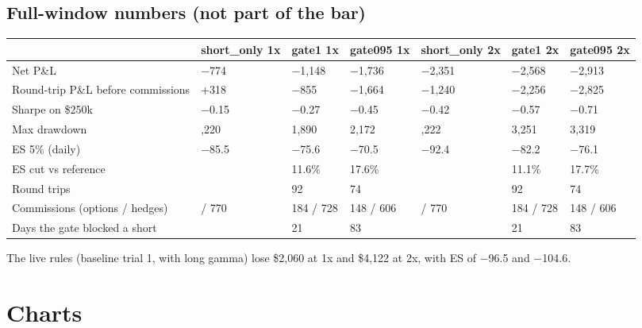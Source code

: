 \documentclass{article}
\begin{document}
\subsection{Full-window numbers (not part of the bar)}

\begin{center}\small
\begin{tabularx}{\linewidth}{>{\raggedright\arraybackslash}X >{\raggedright\arraybackslash}X l l >{\raggedright\arraybackslash}X l l}
\toprule
\textbf{} & \textbf{short\_only 1x} & \textbf{gate1 1x} & \textbf{gate095 1x} & \textbf{short\_only 2x} & \textbf{gate1 2x} & \textbf{gate095 2x} \\
\midrule
Net P\&L & \ensuremath{-}774 & \ensuremath{-}1,148 & \ensuremath{-}1,736 & \ensuremath{-}2,351 & \ensuremath{-}2,568 & \ensuremath{-}2,913 \\
Round-trip P\&L before commissions & +318 & \ensuremath{-}855 & \ensuremath{-}1,664 & \ensuremath{-}1,240 & \ensuremath{-}2,256 & \ensuremath{-}2,825 \\
Sharpe on \$250k & \ensuremath{-}0.15 & \ensuremath{-}0.27 & \ensuremath{-}0.45 & \ensuremath{-}0.42 & \ensuremath{-}0.57 & \ensuremath{-}0.71 \\
Max drawdown & 2,220 & 1,890 & 2,172 & 3,222 & 3,251 & 3,319 \\
ES 5\% (daily) & \ensuremath{-}85.5 & \ensuremath{-}75.6 & \ensuremath{-}70.5 & \ensuremath{-}92.4 & \ensuremath{-}82.2 & \ensuremath{-}76.1 \\
ES cut vs reference &  & 11.6\% & 17.6\% &  & 11.1\% & 17.7\% \\
Round trips & 100 & 92 & 74 & 100 & 92 & 74 \\
Commissions (options /\allowbreak{} hedges) & 200 /\allowbreak{} 770 & 184 /\allowbreak{} 728 & 148 /\allowbreak{} 606 & 200 /\allowbreak{} 770 & 184 /\allowbreak{} 728 & 148 /\allowbreak{} 606 \\
Days the gate blocked a short &  & 21 & 83 &  & 21 & 83 \\
\bottomrule
\end{tabularx}
\end{center}

The live rules (baseline trial 1, with long gamma) lose \$2,060 at 1x and \$4,122 at 2x, with ES of \ensuremath{-}96.5 and \ensuremath{-}104.6.

\section{Charts}
\end{document}
